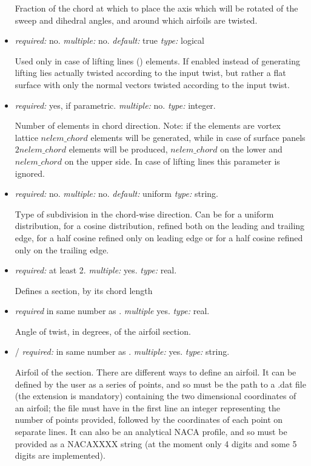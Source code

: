 \begin{itemize}
Fraction of the chord at which to place the axis which will be rotated of the sweep and dihedral angles, and around which airfoils are twisted. 

\item {} \textit{required:} no. \textit{multiple:} no. \textit{default:} true \textit{type:} logical

Used only in case of lifting lines () elements. If enabled instead of generating lifting lies actually twisted according to the input twist, but rather a flat surface with only the normal vectors twisted according to the input twist. 

\item {} \textit{required:} yes, if parametric. \textit{multiple:} no. \textit{type:} integer.

Number of elements in chord direction. Note: if the elements are vortex lattice $nelem\_chord$ elements will be generated, while in case of surface panels $2nelem\_chord$ elements will be produced, $nelem\_chord$ on the lower and $nelem\_chord$ on the upper side. In case of lifting lines this parameter is ignored.

\item {} \textit{required:} no. \textit{multiple:} no. \textit{default:} uniform \textit{type:} string.

Type of subdivision in the chord-wise direction. Can be  for a uniform distribution,  for a cosine distribution, refined both on the leading and trailing edge,  for a half cosine refined only on leading edge or  for a half cosine refined only on the trailing edge. 

\item {} \textit{required:} at least 2. \textit{multiple:} yes. \textit{type:} real.

Defines a section, by its chord length

\item {} \textit{required} in same number as . \textit{multiple} yes. \textit{type:} real.

Angle of twist, in degrees, of the airfoil section.

\item {}/ \textit{required:} in same number as . \textit{multiple:} yes. \textit{type:} string.

Airfoil of the section. There are different ways to define an airfoil. It can be defined by the user as a series of points, and so  must be the path to a .dat file (the extension is mandatory) containing the two dimensional coordinates of an airfoil; the file must have in the first line an integer representing the number of points provided, followed by the coordinates of each point on separate lines. It can also be an analytical NACA profile, and so must be provided as a NACAXXXX string (at the moment only 4 digits and some 5 digits are implemented). 


\end{itemize}

